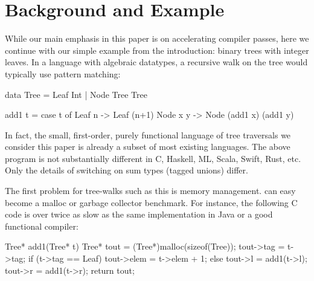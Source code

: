 \documentclass[preprint,10pt,nocopyrightspace,nonatbib]{./bibs/sigplanconf}
\newif\ifcurly
\begin{document}
\section{Background and Example}

While our main emphasis in this paper is on accelerating compiler passes, here
we continue with our simple example from the introduction: binary trees with
integer leaves.
In a language with algebraic datatypes,
a recursive walk on
the tree would typically use pattern matching:

\ifcurly
\begin{code}[language=c]
type Tree = Leaf(Int) | Node(Tree,Tree);

fun add1(t) {
  match(t) {
    Leaf(n):   return Leaf(n+1);
    Node(x,y): return Node(add1(x),add1(y));
  }}
\end{code}
\else
\begin{code}
 data Tree = Leaf Int | Node Tree Tree
  
 add1 t =
  case t of
    Leaf n   -> Leaf (n+1)
    Node x y -> Node (add1 x) (add1 y)
\end{code}
\fi

In fact, the small, first-order, purely functional language of tree traversals
we consider this paper is already a subset of most existing languages.
The above program is not substantially different in C, Haskell, ML, Scala,
Swift, Rust, etc.  Only the details of switching on sum types (tagged unions) differ.

The first problem for tree-walks such as this is memory management.  
can easy become a malloc or garbage collector benchmark.  For instance, the
following C code is over twice as slow as the same implementation in Java or a
good functional compiler:

\begin{code}[language=c]
  Tree* add1(Tree* t) {
    Tree* tout = (Tree*)malloc(sizeof(Tree));
    tout->tag = t->tag;
    if (t->tag == Leaf) {
      tout->elem = t->elem + 1;
    } else {
      tout->l = add1(t->l);
      tout->r = add1(t->r);
    }
    return tout;
  }
\end{code}
\end{document}

